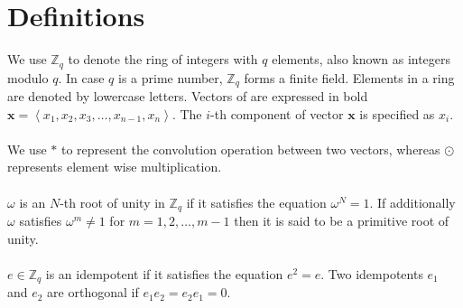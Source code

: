 \documentclass[english,master=eelt,masteroption=ec]{kulemt}
\begin{document}
\section{Definitions}
We use $\mathbb{Z}_q$ to denote the ring of integers with $q$ elements, also known as integers modulo $q$. In case $q$ is a prime number, $\mathbb{Z}_q$ forms a finite field. Elements in a ring are denoted by lowercase letters. Vectors of are expressed in bold $\mathbf{x} = \left \langle x_1, x_2, x_3, \ldots, x_{n-1}, x_n  \right \rangle$. The $i$-th component of vector $\mathbf{x}$ is specified as $x_i$.
\\\\
We use $\ast$ to represent the convolution operation between two vectors, whereas $\odot$ represents element wise multiplication. 
\\\\
$\omega$ is an $N$-th root of unity in $\mathbb{Z}_q$ if it satisfies the equation $\omega^N=1$. If additionally $\omega$ satisfies $\omega^m \neq 1$ for $m=1, 2, \ldots, m-1$ then it is said to be a primitive root of unity.
\\\\
$e \in \mathbb{Z}_q$ is an idempotent if it satisfies the equation $e^2 = e$. Two idempotents $e_1$ and $e_2$ are orthogonal if $e_1 e_2 = e_2 e_1 = 0$.
\end{document}
